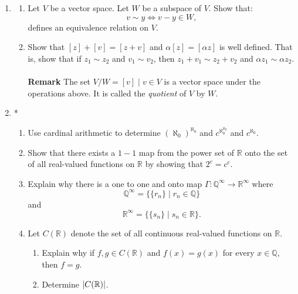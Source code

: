 \documentclass[notoc,notitlepage]{tufte-book}
\begin{document}
\begin{enumerate}
  \item \begin{enumerate}
    \item Let $V$ be a vector space. Let $W$ be a subspace of $V$. Show that:
      \begin{equation*}
        v \sim y \iff v - y \in W,
      \end{equation*}
      defines an equivalence relation on $V$.
    \item Show that $[z] + [v] = [z + v]$ and $\alpha [z] = [\alpha z]$ is well defined. That is, show that if $z_1 \sim z_2$ and $v_1 \sim v_2$, then $z_1 + v_1 \sim z_2 + v_2$ and $\alpha z_1 \sim \alpha z_2$. \\
      $ $ \\
      \textbf{Remark} The set $V / W = [v] \mid v \in V$ is a vector space under the operations above. It is called the \textit{quotient} of $V$ by $W$. 
  \end{enumerate}
    
  \item *\begin{enumerate}
      \item Use cardinal arithmetic to determine $(\aleph_0)^{\aleph_0}$ and $c^{\aleph_0^{\aleph_0}}$ and $c^{\aleph_0}$.
      \item Show that there exists a $1 - 1$ map from the power set of $\mathbb{R}$ onto the set of all real-valued functions on $\mathbb{R}$ by showing that $2^c = c^c$.
      \item Explain why there is a one to one and onto map $\Gamma : \mathbb{Q}^{\infty} \to \mathbb{R}^{\infty}$ where
        \begin{equation*}
          \mathbb{Q}^{\infty} = \{ \{ r_n \} \mid r_n \in \mathbb{Q} \}
        \end{equation*}
        and
        \begin{equation*}
          \mathbb{R}^{\infty} = \{ \{ s_n \} \mid s_n \in \mathbb{R} \}.
        \end{equation*}
      \item Let $C(\mathbb{R})$ denote the set of all continuous real-valued functions on $\mathbb{R}$.
        \begin{enumerate}
          \item Explain why if $f, g \in C(\mathbb{R})$ and $f(x) = g(x)$ for every $x \in \mathbb{Q}$, then $f = g$.\label{item:3_d_1}
          \item Determine $\left| C(\mathbb{R}) \right|$.
        \end{enumerate}
    \end{enumerate}


\end{enumerate}
\end{document}
